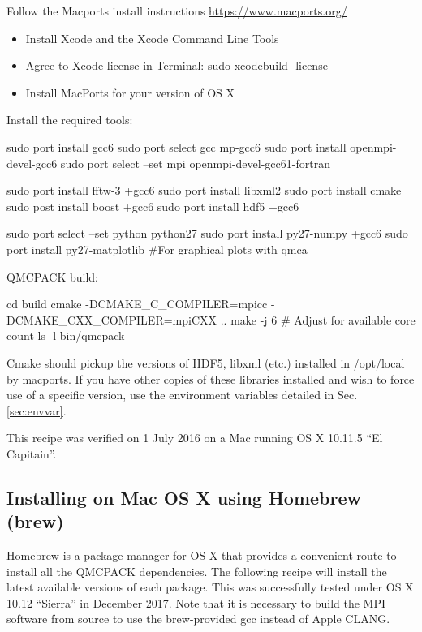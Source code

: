 Follow the Macports install instructions \url{https://www.macports.org/}

\begin{itemize}
\item Install Xcode and the Xcode Command Line Tools
\item Agree to Xcode license in Terminal: sudo xcodebuild -license
\item Install MacPorts for your version of OS X
\end{itemize}


Install the required tools:


\begin{shade}
sudo port install gcc6
sudo port select gcc mp-gcc6
sudo port install openmpi-devel-gcc6
sudo port select --set mpi openmpi-devel-gcc61-fortran

sudo port install fftw-3 +gcc6
sudo port install libxml2
sudo port install cmake
sudo post install boost +gcc6
sudo port install hdf5 +gcc6

sudo port select --set python python27
sudo port install py27-numpy +gcc6
sudo port install py27-matplotlib  #For graphical plots with qmca
\end{shade}

QMCPACK build:

\begin{shade}
cd build
cmake -DCMAKE_C_COMPILER=mpicc -DCMAKE_CXX_COMPILER=mpiCXX ..
make -j 6 # Adjust for available core count
ls -l bin/qmcpack
\end{shade}

Cmake should pickup the versions of HDF5, libxml (etc.) installed in
/opt/local by macports. If you have other copies of these libraries
installed and wish to force use of a specific version, use the
environment variables detailed in Sec. \ref{sec:envvar}.

This recipe was verified on 1 July 2016 on a Mac running OS X 10.11.5
``El Capitain''.

\subsection{Installing on Mac OS X using Homebrew (brew)}
Homebrew is a package manager for OS X that provides a convenient
route to install all the QMCPACK dependencies. The
following recipe will install the latest available versions of each
package. This was successfully tested under OS X 10.12 ``Sierra'' in December 2017. Note that it is necessary to build the MPI software from
source to use the brew-provided gcc instead of Apple CLANG.

